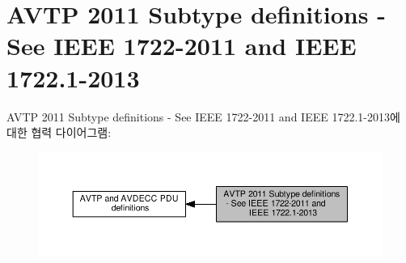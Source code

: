 \hypertarget{group__subtype}{}\section{A\+V\+TP 2011 Subtype definitions -\/ See I\+E\+EE 1722-\/2011 and I\+E\+EE 1722.1-\/2013}
\label{group__subtype}
A\+V\+TP 2011 Subtype definitions -\/ See I\+E\+EE 1722-\/2011 and I\+E\+EE 1722.1-\/2013에 대한 협력 다이어그램\+:
\nopagebreak
\begin{figure}[H]
\begin{center}
\leavevmode
\includegraphics[width=350pt]{group__subtype}
\end{center}
\end{figure}
